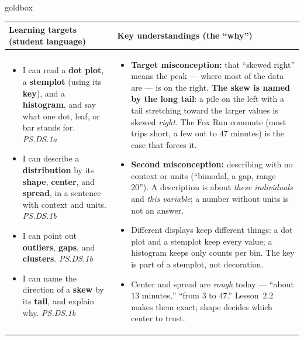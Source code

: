 \documentclass[10pt]{article}
\begin{document}
\renewcommand{\arraystretch}{1.4}
\boxguard
\begin{skillbox}{goldbox}
\begin{tabularx}{\linewidth}{@{}X|X@{}}
\textbf{Learning targets (student language)} & \textbf{Key understandings (the ``why'')} \\[2pt]
\hline
\vspace{-6pt}
\begin{itemize}[leftmargin=1.1em, nosep, after=\vspace{2pt}]
  \item I can read a \textbf{dot plot}, a \textbf{stemplot} (using its \textbf{key}), and a
        \textbf{histogram}, and say what one dot, leaf, or bar stands for.
        \hfill \textit{PS.DS.1a}
  \item I can describe a \textbf{distribution} by its \textbf{shape}, \textbf{center}, and
        \textbf{spread}, in a sentence with context and units. \hfill \textit{PS.DS.1b}
  \item I can point out \textbf{outliers}, \textbf{gaps}, and \textbf{clusters}.
        \hfill \textit{PS.DS.1b}
  \item I can name the direction of a \textbf{skew} by its \textbf{tail}, and explain why.
        \hfill \textit{PS.DS.1b}
\end{itemize}
&
\vspace{-6pt}
\begin{itemize}[leftmargin=1.1em, nosep, after=\vspace{2pt}]
  \item \textbf{Target misconception:} that ``skewed right'' means the peak --- where most of
        the data are --- is on the right. \textbf{The skew is named by the long tail}: a pile on
        the left with a tail stretching toward the larger values is skewed \emph{right}. The
        Fox Run commute (most trips short, a few out to $47$ minutes) is the case that forces it.
  \item \textbf{Second misconception:} describing with no context or units (``bimodal, a gap,
        range 20''). A description is about \emph{these individuals} and \emph{this variable}; a
        number without units is not an answer.
  \item Different displays keep different things: a dot plot and a stemplot keep every value; a
        histogram keeps only counts per bin. The key is part of a stemplot, not decoration.
  \item Center and spread are \emph{rough} today --- ``about $13$ minutes,'' ``from $3$ to $47$.''
        Lesson~2.2 makes them exact; shape decides which center to trust.
\end{itemize}
\end{tabularx}
\end{skillbox}
\end{document}
